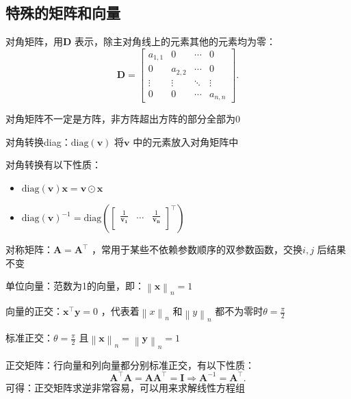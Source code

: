 \subsection{特殊的矩阵和向量}%
\label{sub:特殊的矩阵和向量}
\begin{eg}
    对角矩阵，用$\bm{D}$ 表示，除主对角线上的元素其他的元素均为零：
    \[
        \bm{D}=\begin{bmatrix}
            a_{1,1} & 0 & \cdots & 0\\
            0 & a_{2,2} & \cdots  & 0\\
            \vdots & \vdots & \ddots & \vdots\\
            0 & 0 & \cdots & a_{n,n}
        \end{bmatrix}
    .\]
    \begin{notation}
        对角矩阵不一定是方阵，非方阵超出方阵的部分全部为0
    \end{notation}
\end{eg}
\begin{defi}
    对角转换diag：$\mathrm{diag}(\bm{v})$ 将$\bm{v}$ 中的元素放入对角矩阵中
\end{defi}
对角转换有以下性质：
\begin{itemize}
    \item $\mathrm{diag}(\bm{v})\bm{x}=\bm{v}\odot\bm{x}$
    \item $\mathrm{diag}(\bm{v})^{-1}=\mathrm{diag}(\begin{bmatrix}
            \frac{1}{\bm{v_1}} & \ldots  & \frac{1}{\bm{v_{n}}}\\
    \end{bmatrix}^\top )$
\end{itemize}
\begin{eg}
    对称矩阵：$\bm{A} = \bm{A}^\top $ ，常用于某些不依赖参数顺序的双参数函数，交换$i,j$ 后结果不变
\end{eg}
\begin{eg}
    单位向量：范数为1的向量，即：$\left\lVert \bm{x} \right\rVert_{n}=1$
\end{eg}
\begin{eg}
    向量的正交：$\bm{x}^\top \bm{y}=0$ ，代表着$\left\lVert x \right\rVert_{n}$ 和$\left\lVert y \right\rVert_{n}$ 都不为零时$\theta=\frac{\pi}{2}$

    标准正交：$\theta=\frac{\pi}{2}$ 且$\left\lVert \bm{x} \right\rVert_{n}=\left\lVert \bm{y} \right\rVert_{n}=1$
\end{eg}
\begin{eg}
    正交矩阵：行向量和列向量都分别标准正交，有以下性质：\[
        \bm{A}^\top \bm{A}=\bm{A}\bm{A}^\top =\bm{I}\Rightarrow \bm{A}^{-1}=\bm{A}^\top 
    .\]
    可得：正交矩阵求逆非常容易，可以用来求解线性方程组
\end{eg}
